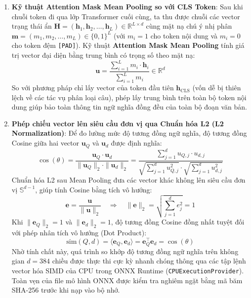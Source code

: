 \begin{enumerate}[nosep]
  \item \textbf{Kỹ thuật Attention Mask Mean Pooling so với CLS Token}:
  Sau khi chuỗi token đi qua lớp Transformer cuối cùng, ta thu được chuỗi các vector trạng thái ẩn $\mathbf{H} = (\mathbf{h}_1, \mathbf{h}_2, \dots, \mathbf{h}_L) \in \mathbb{R}^{L \times d}$ cùng mặt nạ chú ý nhị phân $\mathbf{m} = (m_1, m_2, \dots, m_L) \in \{0, 1\}^L$ (với $m_i = 1$ cho token nội dung và $m_i = 0$ cho token đệm \texttt{[PAD]}). Kỹ thuật \textbf{Attention Mask Mean Pooling} tính giá trị vector đại diện bằng trung bình có trọng số theo mặt nạ:
  \begin{equation}
    \mathbf{u} = \frac{\sum_{i=1}^{L} m_i \cdot \mathbf{h}_i}{\sum_{i=1}^{L} m_i} \in \mathbb{R}^d
    \label{eq:mean_pooling_formula}
  \end{equation}
  So với phương pháp chỉ lấy vector của token đầu tiên $\mathbf{h}_{\text{CLS}}$ (vốn dễ bị thiên lệch về các tác vụ phân loại câu), phép lấy trung bình trên toàn bộ token nội dung giúp bảo toàn thông tin ngữ nghĩa đồng đều của toàn bộ đoạn văn bản.

  \item \textbf{Phép chiếu vector lên siêu cầu đơn vị qua Chuẩn hóa L2 (L2 Normalization)}:
  Để đo lường mức độ tương đồng ngữ nghĩa, độ tương đồng Cosine giữa hai vector $\mathbf{u}_Q$ và $\mathbf{u}_d$ được định nghĩa:
  \begin{equation}
    \cos(\theta) = \frac{\mathbf{u}_Q \cdot \mathbf{u}_d}{\|\mathbf{u}_Q\|_2 \cdot \|\mathbf{u}_d\|_2} = \frac{\sum_{j=1}^{d} u_{Q, j} \cdot u_{d, j}}{\sqrt{\sum_{j=1}^{d} u_{Q, j}^2} \cdot \sqrt{\sum_{j=1}^{d} u_{d, j}^2}}
    \label{eq:cosine_formula}
  \end{equation}
  Chuẩn hóa L2 sau Mean Pooling đưa các vector khác không lên siêu cầu đơn vị $\mathbb{S}^{d-1}$, giúp tính Cosine bằng tích vô hướng:
  \begin{equation}
    \mathbf{e} = \frac{\mathbf{u}}{\|\mathbf{u}\|_2} \quad \Longrightarrow \quad \|\mathbf{e}\|_2 = \sqrt{\sum_{j=1}^{d} e_j^2} = 1
    \label{eq:l2_normalization}
  \end{equation}
  Khi $\|\mathbf{e}_Q\|_2 = 1$ và $\|\mathbf{e}_d\|_2 = 1$, độ tương đồng Cosine đồng nhất tuyệt đối với phép nhân tích vô hướng (Dot Product):
  \begin{equation}
    \text{sim}(Q, d) = \langle \mathbf{e}_Q, \mathbf{e}_d \rangle = \mathbf{e}_Q^\top \mathbf{e}_d = \cos(\theta)
    \label{eq:dot_product_equivalence}
  \end{equation}
  Nhờ tính chất này, quá trình so khớp độ tương đồng ngữ nghĩa trên không gian $d = 384$ chiều được thực thi cực kỳ nhanh chóng thông qua các tập lệnh vector hóa SIMD của CPU trong ONNX Runtime (\texttt{CPUExecutionProvider}). Toàn vẹn của file mô hình ONNX được kiểm tra nghiêm ngặt bằng mã băm SHA-256 trước khi nạp vào bộ nhớ.
\end{enumerate}

